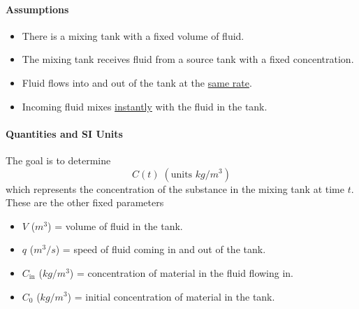 \documentclass[09pt,letterpaper]{article}
\begin{document}
\paragraph{Assumptions}
\begin{itemize}
    \item There is a mixing tank with a fixed volume of fluid.
    \item The mixing tank receives fluid from a source tank with a fixed concentration.
    \item Fluid flows into and out of the tank at the \underline{same rate}.
    \item Incoming fluid mixes \underline{instantly} with the fluid in the tank.
\end{itemize}

\paragraph{Quantities and SI Units}
The goal is to determine 
$$C(t)  \;(\text{units }kg/m^3)$$
which represents the concentration of the substance in the mixing tank at time $t$. These are the other fixed parameters
\begin{itemize}
    \item $V$ ($m^3$) = volume of fluid in the tank.
    \item $q$ ($m^3/s$) = speed of fluid coming in and out of the tank.
    \item $C_{\text{in}}$ ($kg/m^3$)  = concentration of material in the fluid flowing in.
    \item $C_{0}$ ($kg/m^3$)  = initial concentration of material in the tank.
\end{itemize}
\end{document}
